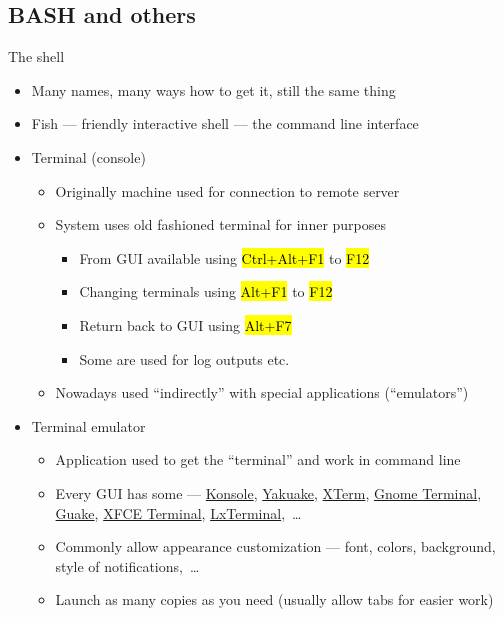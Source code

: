 \documentclass[compress, ucs, xelatex, 11pt, xcolor=svgnames,
  hyperref={
    bookmarks=true,
    unicode=true,
    colorlinks=true,
    pdftitle={Linux, command line and MetaCentrum},
    plainpages=false,
    pdfauthor={Vojtech Zeisek},
    pdfsubject={Course about use of Linux command line, writing shell scripts and using MetaCentrum of CESNET},
    pdfcreator={XeLaTeX},
    pdfkeywords={Linux, GNU, BASH, shell, command line, MetaCentrum},
    linkcolor=DarkRed,
    anchorcolor=DarkBlue,
    citecolor=Indigo,
    filecolor=NavyBlue,
    menucolor=DarkMagenta,
    urlcolor=DarkBlue,
    pdftex},
  url={hyphens, lowtilde} %
  ]{beamer}
\renewcommand{\texttt}[1]{\hl{\ttfamily #1}}
\begin{document}
\subsection[SH]{BASH and others}

\begin{frame}{The shell} 
  \begin{itemize}
    \item Many names, many ways how to get it, still the same thing
    \item Fish --- friendly interactive shell --- the command line interface
    \item Terminal (console)
    \begin{itemize}
      \item Originally machine used for connection to remote server
      \item System uses old fashioned terminal for inner purposes
      \begin{itemize}
	\item From GUI available using \texttt{Ctrl+Alt+F1} to \texttt{F12}
	\item Changing terminals using \texttt{Alt+F1} to \texttt{F12}
	\item Return back to GUI using \texttt{Alt+F7}
	\item Some are used for log outputs etc.
      \end{itemize}
      \item Nowadays used ``indirectly'' with special applications (``emulators'')
    \end{itemize}
    \item Terminal emulator
    \begin{itemize}
      \item Application used to get the ``terminal'' and work in command line
      \item Every GUI has some --- \href{https://konsole.kde.org/}{Konsole}, \href{https://yakuake.kde.org/}{Yakuake}, \href{https://invisible-island.net/xterm/}{XTerm}, \href{https://wiki.gnome.org/Apps/Terminal}{Gnome Terminal}, \href{http://guake.org/}{Guake}, \href{https://docs.xfce.org/apps/terminal/start}{XFCE Terminal}, \href{https://wiki.lxde.org/en/LXTerminal}{LxTerminal},~\ldots
      \item Commonly allow appearance customization --- font, colors, background, style of notifications,~\ldots
      \item Launch as many copies as you need (usually allow tabs for easier work)
    \end{itemize}
  \end{itemize}
\end{frame}
\end{document}
